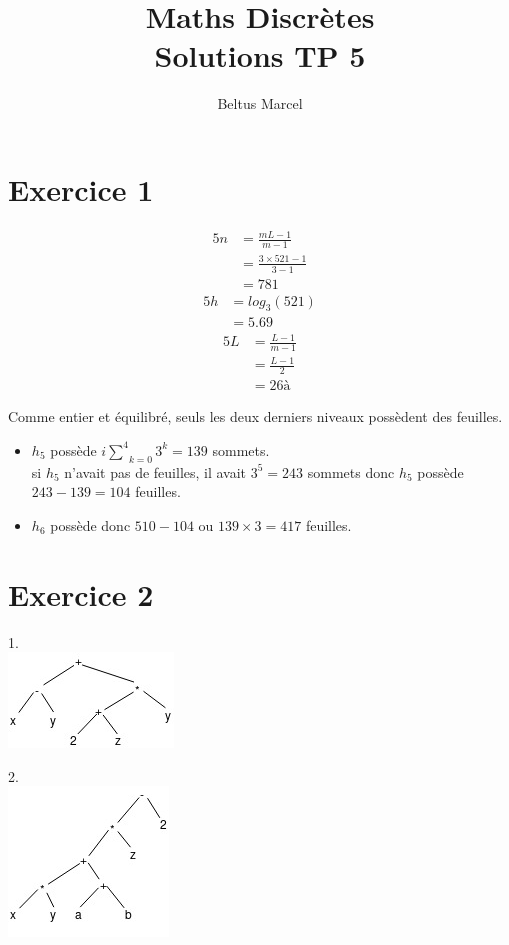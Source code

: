 \documentclass[fontsize=10pt]{article}
\title{\textbf{Maths Discrètes}\\ Solutions TP 5}
\author{Beltus Marcel}
\date{}
\begin{document}
\maketitle %


\section*{Exercice 1}

\begin{alignat*}{5}
n &= \frac{mL -1}{m-1}\\
&= \frac{3\times 521 -1}{3-1}\\
&= 781
\end{alignat*}
\begin{alignat*}{5}
h &= log_3(521)\\
&= 5.69
\end{alignat*}
\begin{alignat*}{5}
L &= \frac{L -1}{m-1}\\
&= \frac{L-1}{2}\\
&= 26à
\end{alignat*}

Comme entier et équilibré, seuls les deux derniers niveaux possèdent des feuilles.
\begin{itemize}
\item $h_5$ possède $i\underset{k=0}{\overset{4}{\sum}}3^k = 139$ sommets.\\
si $h_5$ n'avait pas de feuilles, il avait $3^5 = 243$ sommets donc $h_5$ possède $243-139 =104$ feuilles.
\item $h_6$ possède donc $510-104$ ou $139 \times 3 = 417$ feuilles.
\end{itemize}


\section*{Exercice 2}


1.\\ \includegraphics[scale=1]{TP6Exo2_1.jpg} 


\hspace{-0.58cm}2.\\ \includegraphics[scale=1]{TP6Exo2_2.jpg} 
\end{document}
